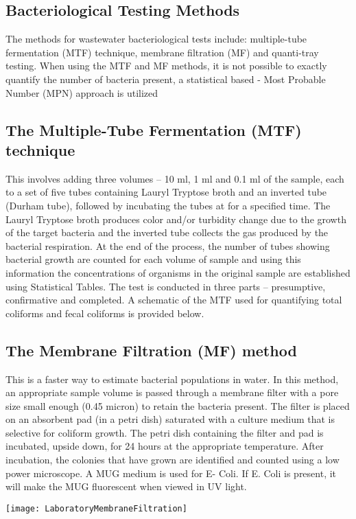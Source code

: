 \subsection{Bacteriological Testing Methods}
The methods for wastewater bacteriological tests include:  multiple-tube fermentation (MTF) technique, membrane filtration (MF) and quanti-tray testing.  When using the MTF and MF methods, it is not possible to exactly quantify the number of bacteria present, a statistical based - Most Probable Number (MPN) approach is utilized\\
\subsection{The Multiple-Tube Fermentation (MTF) technique}
This involves adding three volumes – 10 ml, 1 ml and 0.1 ml of the sample, each to a set of five tubes containing Lauryl Tryptose broth and an inverted tube (Durham tube), followed by incubating the tubes at  for a specified time.  The Lauryl Tryptose broth produces color and/or turbidity change due to the growth of the target bacteria and the inverted tube collects the gas produced by the bacterial respiration.  At the end of the process, the number of tubes showing bacterial growth are counted for each volume of sample and using this information the concentrations of organisms in the original sample are established using Statistical Tables.  The test is conducted in three parts – presumptive, confirmative and completed.  A schematic of the MTF used for quantifying total coliforms and fecal coliforms is provided below.\\
\newpage
\thispagestyle{empty}


\newpage
\subsection{The Membrane Filtration (MF) method}
This is a faster way to estimate bacterial populations in water.  In this method, an appropriate sample volume is passed through a membrane filter with a pore size small enough (0.45 micron) to retain the bacteria present. The filter is placed on an absorbent pad (in a petri dish) saturated with a culture medium that is selective for coliform growth. The petri dish containing the filter and pad is incubated, upside down, for 24 hours at the appropriate temperature. After incubation, the colonies that have grown are identified and counted using a low power microscope. A MUG medium is used for E- Coli.  If E. Coli is present, it will make the MUG fluorescent when viewed in UV light. 
\begin{center}
\texttt{[image: LaboratoryMembraneFiltration]}
\end{center}
\pagebreak


